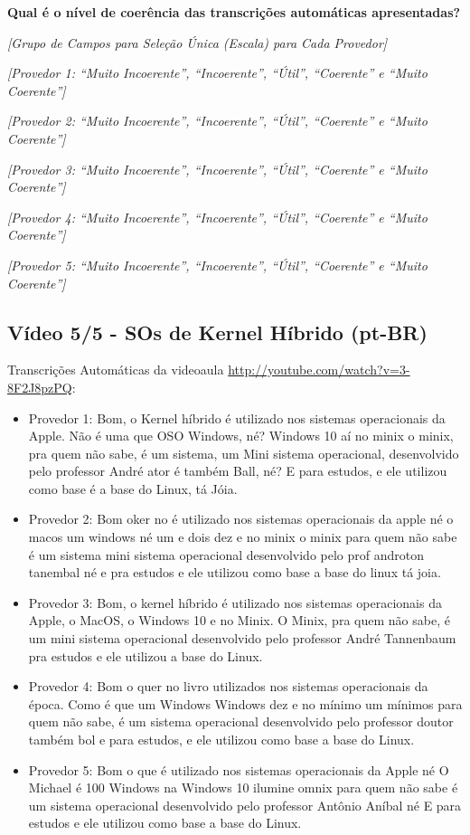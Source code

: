\noindent
\textbf{Qual é o nível de coerência das transcrições automáticas apresentadas?}

\noindent
\textit{[Grupo de Campos para Seleção Única (Escala) para Cada Provedor]}

\noindent
\textit{[Provedor 1: ``Muito Incoerente'', ``Incoerente'', ``Útil'', ``Coerente'' e ``Muito Coerente'']}

\noindent
\textit{[Provedor 2: ``Muito Incoerente'', ``Incoerente'', ``Útil'', ``Coerente'' e ``Muito Coerente'']}

\noindent
\textit{[Provedor 3: ``Muito Incoerente'', ``Incoerente'', ``Útil'', ``Coerente'' e ``Muito Coerente'']}

\noindent
\textit{[Provedor 4: ``Muito Incoerente'', ``Incoerente'', ``Útil'', ``Coerente'' e ``Muito Coerente'']}

\noindent
\textit{[Provedor 5: ``Muito Incoerente'', ``Incoerente'', ``Útil'', ``Coerente'' e ``Muito Coerente'']}

\subsection{Vídeo 5/5 - SOs de Kernel Híbrido (pt-BR)}

\noindent
Transcrições Automáticas da videoaula \url{http://youtube.com/watch?v=3-8F2J8pzPQ}:

\begin{itemize}
    \item Provedor 1: Bom, o Kernel híbrido é utilizado nos sistemas operacionais da Apple. Não é uma que OSO Windows, né? Windows 10 aí no minix o minix, pra quem não sabe, é um sistema, um Mini sistema operacional, desenvolvido pelo professor André ator é também Ball, né? E para estudos, e ele utilizou como base é a base do Linux, tá Jóia.
    \item Provedor 2: Bom oker no é utilizado nos sistemas operacionais da apple né o macos um windows né um e dois dez e no minix o minix para quem não sabe é um sistema mini sistema operacional desenvolvido pelo prof androton tanembal né e pra estudos e ele utilizou como base a base do linux tá joia.
    \item Provedor 3: Bom, o kernel híbrido é utilizado nos sistemas operacionais da Apple, o MacOS, o Windows 10 e no Minix. O Minix, pra quem não sabe, é um mini sistema operacional desenvolvido pelo professor André Tannenbaum pra estudos e ele utilizou a base do Linux.
    \item Provedor 4: Bom o quer no livro utilizados nos sistemas operacionais da época. Como é que um Windows Windows dez e no mínimo um mínimos para quem não sabe, é um sistema operacional desenvolvido pelo professor doutor também bol e para estudos, e ele utilizou como base a base do Linux.
    \item Provedor 5: Bom o que é utilizado nos sistemas operacionais da Apple né O Michael é 100 Windows na Windows 10 ilumine omnix para quem não sabe é um sistema operacional desenvolvido pelo professor Antônio Aníbal né E para estudos e ele utilizou como base a base do Linux.
\end{itemize}

